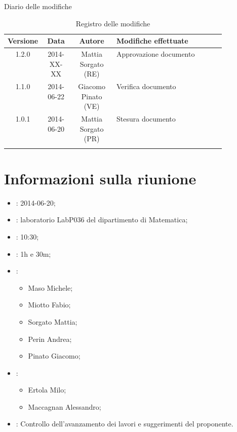 
\newpage
Diario delle modifiche
\begin{center}
\begin{longtable}{|c|c|c|p{0.5\linewidth}|}
\toprule
\textbf{Versione} & \textbf{Data} & \textbf{Autore} & \textbf{Modifiche effettuate}\\


\midrule
1.2.0 & 2014-XX-XX & Mattia Sorgato (RE) & Approvazione documento \\	%
\midrule
1.1.0 & 2014-06-22 & Giacomo Pinato (VE) & Verifica documento \\		%
\midrule
1.0.1 & 2014-06-20 & Mattia Sorgato (PR) & Stesura documento \\

\bottomrule
\caption{Registro delle modifiche}
\label{tab:changelog}
\end{longtable}
\end{center}

\newpage
\tableofcontents


\newpage
\section{Informazioni sulla riunione}%
\label{1.0}
\begin{itemize}
\item {}: 2014-06-20;
\item {}: laboratorio LabP036 del dipartimento di Matematica;
\item {}: 10:30;
\item {}: 1h e 30m;
\item {}: \NomeGruppo{}
\begin{itemize}
\item Maso Michele;
\item Miotto Fabio;
\item Sorgato Mattia;
\item Perin Andrea;
\item Pinato Giacomo;
\end{itemize}
\item {}: \Prop{}
\begin{itemize}
\item Ertola Milo;
\item Maccagnan Alessandro;
\end{itemize}
\item {}: Controllo dell'avanzamento dei lavori e suggerimenti del proponente.
\end{itemize}

